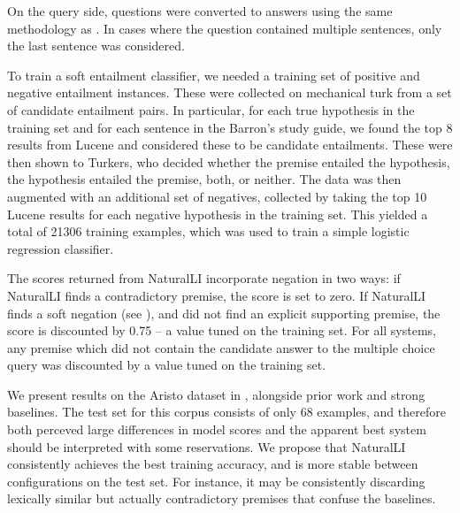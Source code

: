 On the query side, questions were converted to answers using the same methodology as
  .
In cases where the question contained multiple sentences, only the last sentence
  was considered.

%
%
To train a soft entailment classifier, we needed a training set of positive
  and negative entailment instances.
These were collected on mechanical turk from a set of candidate entailment pairs.
In particular, for each true hypothesis in the training set and for each sentence
  in the Barron's study guide, we found the top 8 results from Lucene and considered
  these to be candidate entailments.
These were then shown to Turkers, who decided whether the premise entailed the
  hypothesis, the hypothesis entailed the premise, both, or neither.
The data was then augmented with an additional set of negatives, collected by taking
  the top 10 Lucene results for each negative hypothesis in the training set.
This yielded a total of \num{21306} training examples, which was used to train
  a simple logistic regression classifier.

The scores returned from NaturalLI incorporate negation in two ways:
  if NaturalLI finds a contradictory premise, the score is set to zero.
If NaturalLI finds a soft negation (see ),
  and did not find an explicit supporting premise, the score is discounted
  by 0.75 -- a value tuned on the training set.
For all systems, any premise which did not contain the candidate answer to the
  multiple choice query was discounted by a value tuned on the training
  set.


%
%
We present results on the Aristo dataset in ,
  alongside prior work and strong baselines.
The test set for this corpus consists of only 68 examples,
  and therefore both perceved large differences in model scores 
  and the apparent best system should be interpreted with some reservations.
We propose that NaturalLI consistently achieves the best training accuracy,
  and is more stable between configurations on the test set.
For instance,
  it may be consistently discarding lexically similar but actually contradictory
  premises that confuse the baselines.

